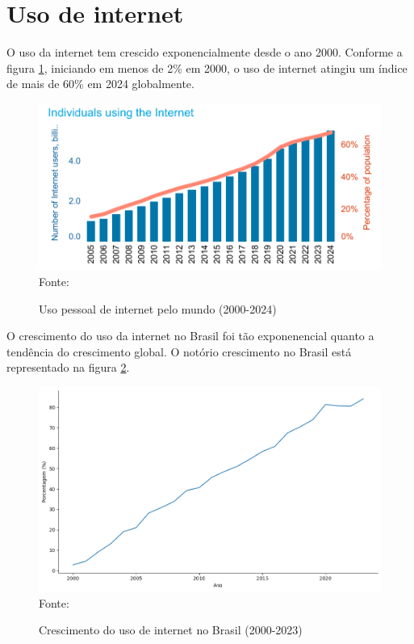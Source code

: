 \section{Uso de internet}

O uso da internet tem crescido exponencialmente desde o ano 2000. Conforme a figura \ref{fig:individuals_using_internet_itu}, iniciando em menos de 2\% em 2000, o uso de internet atingiu um índice de mais de 60\% em 2024 globalmente. 

\begin{figure}[ht]
    \centering
    \caption{Uso pessoal de internet pelo mundo (2000-2024)}
    \includegraphics[width=0.78\linewidth]{figuras/internet/individuals_using_internet_itu.png}
    \label{fig:individuals_using_internet_itu}
    \\ \footnotesize{Fonte: \cite{ITU_uso_internet_mundo}}
\end{figure}

O crescimento do uso da internet no Brasil foi tão exponenencial quanto a tendência do crescimento global. O notório crescimento no Brasil está representado na figura \ref{fig:crescimento_internet_brasil_itu}.

\begin{figure}[ht]
    \centering
    \caption{Crescimento do uso de internet no Brasil (2000-2023)}
    \includegraphics[width=1\linewidth]{figuras/internet/lineplot_uso_internet_brasil_itu.png}
    \label{fig:crescimento_internet_brasil_itu}
    \footnotesize{Fonte: \cite{ITU_crescimento_uso_internet_brasil}}
\end{figure}

